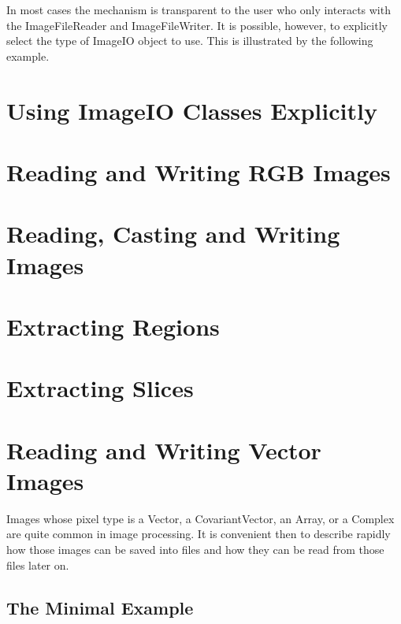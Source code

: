 In most cases the mechanism is transparent to the user who only interacts
with the ImageFileReader and ImageFileWriter. It is
possible, however, to explicitly select the type of ImageIO object
to use.  This is illustrated by the following example.

\section{Using ImageIO Classes Explicitly}
\label{sec:ImageReadExportVTK}
%


\section{Reading and Writing RGB Images}
\label{sec:RGBImagReadWrite}
%

\section{Reading, Casting and Writing Images}
\label{sec:ImagReadCastWrite}
%

\section{Extracting Regions}
\label{sec:ImagReadRegionOfInterestWrite}
%

\section{Extracting Slices}
\label{sec:ImagReadExtractWrite}
%


\section{Reading and Writing Vector Images}
\label{sec:VectorImagReadWrite}

Images whose pixel type is a Vector, a CovariantVector, an Array, or a Complex
are quite common in image processing. It is convenient then to describe rapidly
how those images can be saved into files and how they can be read from those
files later on.

\subsection{The Minimal Example}
\label{VectorImageReadWrite}
%

